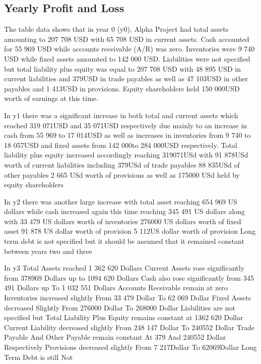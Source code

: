 

\subsection{Yearly Profit and Loss}\label{sec:title}

The table data shows that in year 0 (y0), Alpha Project had total assets amounting to 207 708 USD with 65 708 USD in current assets. Cash accounted for 55 969 USD while accounts receivable (A/R) was zero. Inventories were 9 740 USD while fixed assets amounted to 142 000 USD. Liabilities were not specified but total liability plus equity was equal to 207 708 USD with 48 895 USD in current liabilities and 379USD in trade payables as well as 47 103USD in other payables and 1 413USD in provisions. Equity shareholders held 150 000USD worth of earnings at this time. 

In y1 there was a significant increase in both total and current assets which reached 319 071USD and 35 071USD respectively due mainly to an increase in cash from 55 969 to 17 014USD as well as increases in inventories from 9 740 to 18 057USD and fixed assets from 142 000to 284 000USD respectively. Total liability plus equity increased accordingly reaching 319071USd with 91 878USd worth of current liabilities including 379USd of trade payables 88 835USd of other payables 2 665 USd worth of provisions as well as 175000 USd held by equity shareholders 

In y2 there was another large increase with total asset reaching 654 969 US dollars while cash increased again this time reaching 345 491 US dollars along with 33 479 US dollars worth of inventories 276000 US dollars worth of fixed asset 91 878 US dollar worth of provision 5 112US dollar worth of provision Long term debt is not specified but it should be assumed that it remained constant between years two and three 

 In y3 Total Assets reached 1 362 620 Dollars Current Assets rose significantly from 378969 Dollars up to 1094 620 Dollars Cash also rose significantly from 345 491 Dollars up To 1 032 551 Dollars Accounts Receivable remain at zero Inventories increased slightly From 33 479 Dollar To 62 069 Dollar Fixed Assets decreased Slightly From 276000 Dollar To 268000 Dollar Liabilities are not specified but Total Liability Plus Equity remains constant at 1362 620 Dollar Current Liability decreased slightly From 248 147 Dollar To 240552 Dollar Trade Payable And Other Payable remain constant At 379 And 240552 Dollar Respectively Provisions decreased slightly From 7 217Dollar To 62069Dollar Long Term Debt is still Not
